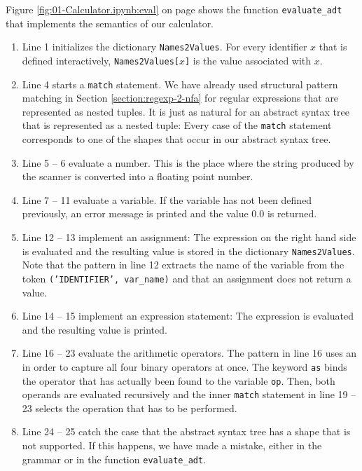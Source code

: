 \noindent
Figure \ref{fig:01-Calculator.ipynb:eval} on page \pageref{fig:01-Calculator.ipynb:eval} shows the
function \texttt{evaluate\_adt} that implements the semantics of our calculator.
\begin{enumerate}
\item Line 1 initializes the dictionary \texttt{Names2Values}.  For every identifier $x$ that is defined
      interactively, \texttt{Names2Values[$x$]} is the value associated with $x$.
\item Line 4 starts a \texttt{match} statement.  We have already used structural pattern
      matching in Section \ref{section:regexp-2-nfa} for regular expressions that are
      represented as nested tuples.  It is just as natural for an abstract syntax tree that is represented as a
      nested tuple:  Every case of the \texttt{match} statement corresponds to one of the shapes that occur in
      our abstract syntax tree.
\item Line 5 -- 6 evaluate a number.  This is the place where the string produced by the scanner is
      converted into a floating point number.
\item Line 7 -- 11 evaluate a variable.  If the variable has not been defined previously, an error message
      is printed and the value $0.0$ is returned.
\item Line 12 -- 13 implement an assignment:  The expression on the right hand side is evaluated and the
      resulting value is stored in the dictionary \texttt{Names2Values}.  Note that the pattern in line 12
      extracts the name of the variable from the token \texttt{('IDENTIFIER', var\_name)} and that an
      assignment does not return a value.
\item Line 14 -- 15 implement an expression statement:  The expression is evaluated and the resulting value
      is printed.
\item Line 16 -- 23 evaluate the arithmetic operators.  The pattern in line 16 uses an  in
      order to capture all four binary operators at once.  The keyword \texttt{as} binds the operator that
      has actually been found to the variable \texttt{op}.  Then, both operands are evaluated recursively
      and the inner \texttt{match} statement in line 19 -- 23 selects the operation that has to be
      performed.
\item Line 24 -- 25 catch the case that the abstract syntax tree has a shape that is not supported.  If
      this happens, we have made a mistake, either in the grammar or in the function
      \texttt{evaluate\_adt}.
\end{enumerate}
\FloatBarrier

